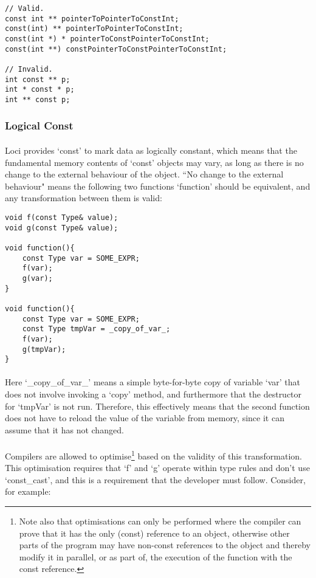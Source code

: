 \documentclass[12pt,twoside,notitlepage]{report}
\begin{document}
\begin{lstlisting}
// Valid.
const int ** pointerToPointerToConstInt;
const(int) ** pointerToPointerToConstInt;
const(int *) * pointerToConstPointerToConstInt;
const(int **) constPointerToConstPointerToConstInt;

// Invalid.
int const ** p;
int * const * p;
int ** const p;
\end{lstlisting}

\subsubsection{Logical Const}

\paragraph{}
Loci provides `const' to mark data as logically constant, which means that the fundamental memory contents of `const' objects may vary, as long as there is no change to the external behaviour of the object. ``No change to the external behaviour" means the following two functions `function' should be equivalent, and any transformation between them is valid:

\begin{lstlisting}
void f(const Type& value);
void g(const Type& value);

void function(){
	const Type var = SOME_EXPR;
	f(var);
	g(var);
}

void function(){
	const Type var = SOME_EXPR;
	const Type tmpVar = _copy_of_var_;
	f(var);
	g(tmpVar);
}
\end{lstlisting}

\paragraph{}
Here `\_copy\_of\_var\_' means a simple byte-for-byte copy of variable `var' that does not involve invoking a `copy' method, and furthermore that the destructor for `tmpVar' is not run. Therefore, this effectively means that the second function does not have to reload the value of the variable from memory, since it can assume that it has not changed.

\paragraph{}
Compilers are allowed to optimise\footnote{Note also that optimisations can only be performed where the compiler can prove that it has the only (const) reference to an object, otherwise other parts of the program may have non-const references to the object and thereby modify it in parallel, or as part of, the execution of the function with the const reference.} based on the validity of this transformation. This optimisation requires that `f' and `g' operate within type rules and don't use `const\_cast', and this is a requirement that the developer must follow. Consider, for example:
\end{document}
